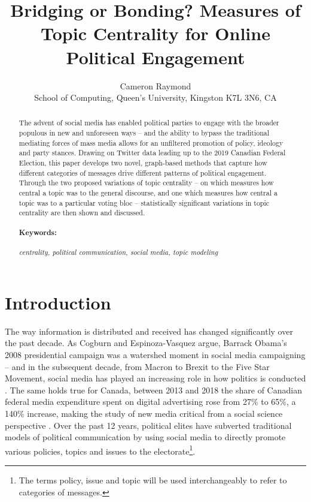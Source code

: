 \documentclass{nws}
\title[Bridging or Bonding? Measures of Topic Centrality for Online Political Engagement]
      {Bridging or Bonding? Measures of Topic Centrality for Online Political Engagement}
\author[C.J.K Raymond]
        {Cameron Raymond\\
        School of Computing, Queen's University, Kingston K7L 3N6, CA\\
         \email{c.raymond@queensu.ca}}
\begin{document}
\label{firstpage}

\maketitle

\begin{abstract}
  The advent of social media has enabled political parties to engage with the
  broader populous in new and unforeseen ways -- and the ability to bypass the
  traditional mediating forces of mass media allows for an unfiltered promotion
  of policy, ideology and party stances. Drawing on Twitter data leading up to
  the 2019 Canadian Federal Election, this paper develops two novel, graph-based methods that
  capture how different categories of messages drive different patterns of political
  engagement. Through the two proposed variations of topic centrality -- on which
  measures how central a topic was to the general discourse, and one which
  measures how central a topic was to a particular voting bloc -- statistically
  significant variations in topic centrality are then shown and discussed. %
  \paragraph{Keywords:} \emph{centrality, political communication, social media, topic modeling}
\end{abstract}

\tableofcontents

\section{Introduction}

The way information is distributed and received has changed significantly over
the past decade. As Cogburn and Espinoza-Vasquez argue, Barrack Obama’s 2008
presidential campaign was a watershed moment in social media campaigning – and
in the subsequent decade, from Macron to Brexit to the Five Star Movement,
social media has played an increasing role in how politics is conducted
\cite{cogburn2011networked}.  The same holds true for Canada, between 2013 and
2018 the share of Canadian federal media expenditure spent on digital
advertising rose from 27\% to 65\%, a 140\% increase, making the study of new
media critical from a social science perspective
\cite{annualReportCanadaAdvertisingActivities_2018}. Over the past 12 years,
political elites have subverted traditional models of political communication by
using social media to directly promote various policies, topics and issues to
the electorate\footnote{The
terms policy, issue and topic will be used interchangeably to refer to
categories of messages.}\cite{mcnair2017introduction}.
\end{document}
